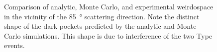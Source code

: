\begin{figure}
\caption{Comparison of analytic, Monte Carlo, and experimental weirdospace
in the vicinity of the \SI{85}{\degree} scattering direction.  Note the
distinct shape of the dark pockets predicted by the analytic and Monte
Carlo simulations.  This shape is due to interference of the two Type
 events.}
\label{fig:scat85degree}
\end{figure}

\begin{figure}
\centering
{}
\\
\\

\end{figure}
